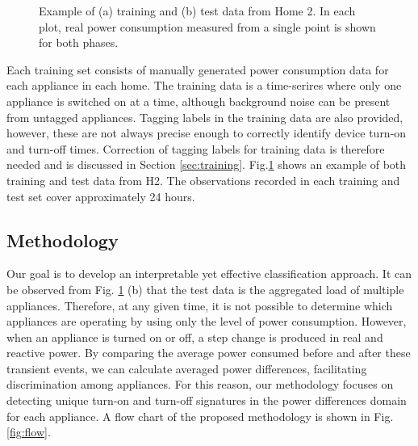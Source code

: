 \documentclass[conference]{IEEEtran}
\begin{document}
\begin{figure}[!t]	
	\centering
	\hfil
	\caption{Example of (a) training and (b) test data from Home 2.  In each plot, real power consumption measured from a single point is shown for both phases. } 
	\label{fig:traintest}
\end{figure}

Each training set consists of manually generated power consumption data for each appliance in each home.  The training data is a time-serires where only one appliance is switched on at a time, although background noise can be present from untagged appliances. Tagging labels in the training data are also provided, however, these are not always precise enough to correctly identify device turn-on and turn-off times. Correction of tagging labels for training data is therefore needed and is discussed in Section \ref{sec:training}.  Fig.\ref{fig:traintest} shows an example of both training and test data from H2.  The observations recorded in each training and test set cover approximately 24 hours.  

\subsection{Methodology}
Our goal is to develop an interpretable yet effective classification approach.  It can be observed from Fig. \ref{fig:traintest} (b) that the test data is the aggregated load of multiple appliances.  Therefore, at any given time, it is not possible to determine which appliances are operating by using only the level of power consumption.  However, when an appliance is turned on or off, a step change is produced in real and reactive power.  By comparing the average power consumed before and after these transient events, we can calculate averaged power differences, facilitating discrimination among appliances.  For this reason, our methodology focuses on detecting unique turn-on and turn-off signatures in the power differences domain for each appliance.  A flow chart of the proposed methodology is shown in Fig. \ref{fig:flow}.
\end{document}
